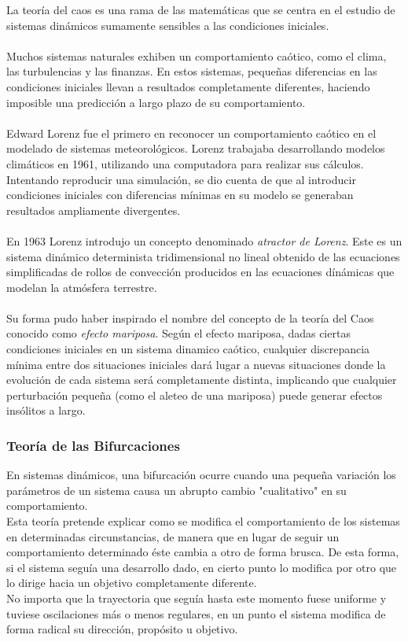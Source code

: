 \documentclass[letterpaper,12pt]{article}
\begin{document}
La teoría del caos es una rama de las matemáticas que se centra en el estudio de sistemas dinámicos sumamente sensibles a las condiciones iniciales.  
\\\\
Muchos sistemas naturales exhiben un comportamiento caótico, como el clima, las turbulencias y las finanzas.
En estos sistemas, pequeñas diferencias en las condiciones iniciales llevan a resultados completamente diferentes, haciendo imposible una predicción a largo plazo de su comportamiento.
\\\\
Edward Lorenz fue el primero en reconocer un comportamiento caótico en el modelado de sistemas meteorológicos. Lorenz trabajaba desarrollando modelos climáticos en 1961, utilizando una computadora para realizar sus cálculos. Intentando reproducir una simulación, se dio cuenta de que al introducir condiciones iniciales con diferencias mínimas en su modelo se generaban resultados ampliamente divergentes. 
\\\\
En 1963 Lorenz introdujo un concepto denominado \emph{atractor de Lorenz}. Este es un sistema dinámico determinista tridimensional no lineal obtenido de las ecuaciones simplificadas de rollos de convección producidos en las ecuaciones dínámicas que modelan la atmósfera terrestre. 
\\\\ 
Su forma pudo haber inspirado el nombre del concepto de la teoría del Caos conocido como \emph{efecto mariposa}. Según el efecto mariposa, dadas ciertas condiciones iniciales en un sistema dinamico caótico, cualquier discrepancia mínima entre dos situaciones iniciales dará lugar a nuevas situaciones donde la evolución de cada sistema será completamente distinta, implicando que cualquier perturbación pequeña (como el aleteo de una mariposa) puede generar efectos insólitos a largo. 

\subsubsection{Teoría de las Bifurcaciones}
 En sistemas dinámicos, una bifurcación ocurre cuando una pequeña variación los parámetros de un sistema causa un abrupto cambio "cualitativo" en su comportamiento.\\
 Esta teoría pretende explicar como se modifica el comportamiento de los sistemas en determinadas circunstancias, de manera que en lugar de seguir un comportamiento determinado éste cambia a otro de forma brusca. De esta forma, si el sistema seguía una desarrollo dado, en cierto punto lo modifica por otro que lo dirige hacia un objetivo completamente diferente.\\ 
No importa que la trayectoria que seguía hasta este momento fuese uniforme  y tuviese oscilaciones más o menos regulares, en un punto el sistema modifica de forma radical su dirección, propósito u objetivo. 
    
\end{document}
